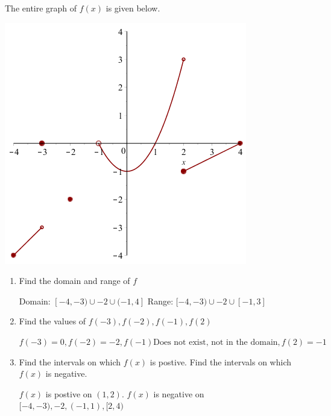 \documentclass[handout]{ximera}
\begin{document}
\begin{instructorNotes}

\end{instructorNotes}

\begin{problem}
The entire graph of $f(x)$ is given below.

	\begin{image}
	\includegraphics{Figure2.png}
	\end{image}

\begin{enumerate}	
	\item  Find the domain and range of $f$
		\begin{freeResponse}
			Domain: $[-4,-3)\cup{-2}\cup(-1,4]$
			Range: $[-4,-3)\cup{-2}\cup[-1,3]$
		\end{freeResponse}	

	\item  Find the values of $f(-3),f(-2), f(-1),f(2)$
		\begin{freeResponse}
		$f(-3)=0, f(-2)=-2, f(-1) \text{Does not exist, not in the domain}, f(2)=-1$
		\end{freeResponse}	

	\item  Find the intervals on which $f(x)$ is postive.  Find the intervals on which $f(x)$ is negative.
		\begin{freeResponse}
		 $f(x)$ is postive on $(1,2)$. $f(x)$ is negative on $[-4,-3),{-2},(-1,1),[2,4)$
		\end{freeResponse}
	

\end{enumerate}
\end{problem}
\end{document}
